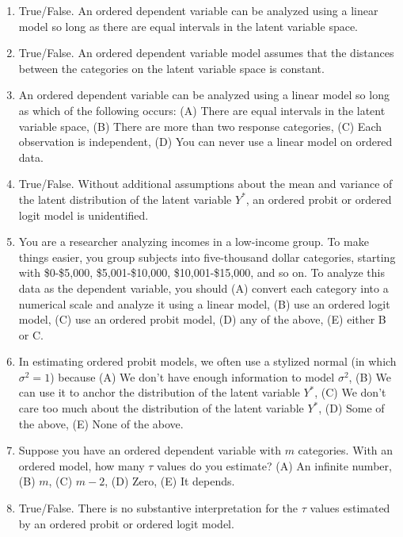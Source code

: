 \documentclass[11pt]{article}
\begin{document}
\begin{enumerate}
\item True/False. An ordered dependent variable can be analyzed using a linear model so long as there are equal intervals in the latent variable space. 
\item True/False.  An ordered dependent variable model assumes that the distances between the categories on the latent variable space is constant. 
\item An ordered dependent variable can be analyzed using a linear model so long as which of the following occurs: (A) There are equal intervals in the latent variable space, (B) There are more than two response categories, (C) Each observation is independent, (D) You can never use a linear model on ordered data. 
\item True/False.  Without additional assumptions about the mean and variance of the latent distribution of the latent variable $Y^*$, an ordered probit or ordered logit model is unidentified. 
\item You are a researcher analyzing incomes in a low-income group. To make things easier, you group subjects into five-thousand dollar categories, starting with \$0-\$5,000, \$5,001-\$10,000, \$10,001-\$15,000, and so on.  To analyze this data as the dependent variable, you should (A) convert each category into a numerical scale and analyze it using a linear model, (B) use an ordered logit model, (C) use an ordered probit model, (D) any of the above, (E) either B or C. 
\item In estimating ordered probit models, we often use a stylized normal (in which $\sigma^2 =1$) because (A) We don't have enough information to model $\sigma^2$, (B) We can use it to anchor the distribution of the latent variable $Y^*$, (C) We don't care too much about the distribution of the latent variable $Y^*$, (D) Some of the above, (E) None of the above.  
\item Suppose you have an ordered dependent variable with $m$ categories. With an ordered model, how many $\tau$ values do you estimate? (A) An infinite number, (B) $m$, (C) $m-2$, (D) Zero, (E) It depends. 
\item True/False. There is no substantive interpretation for the $\tau$ values estimated by an ordered probit or ordered logit model. 

\end{enumerate}
\end{document}
